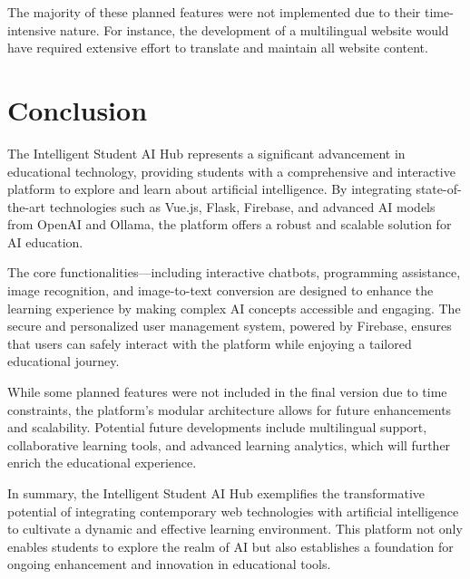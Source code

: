 The majority of these planned features were not implemented due to their time-intensive nature. For instance, the development of a multilingual website would have required extensive effort to translate and maintain all website content.

\section{Conclusion}

The Intelligent Student AI Hub represents a significant advancement in educational technology, 
providing students with a comprehensive and interactive platform to explore and learn about artificial intelligence. 
By integrating state-of-the-art technologies such as Vue.js, Flask, Firebase, and advanced AI models from OpenAI and Ollama, 
the platform offers a robust and scalable solution for AI education.

The core functionalities—including interactive chatbots, programming assistance, image recognition, 
and image-to-text conversion are designed to enhance the learning experience by making complex AI concepts accessible and engaging. 
The secure and personalized user management system, powered by Firebase, ensures that users can safely interact with the platform while enjoying a tailored educational journey.

While some planned features were not included in the final version due to time constraints, the platform's modular architecture allows for future enhancements and scalability.
Potential future developments include multilingual support, collaborative learning tools, and advanced learning analytics, 
which will further enrich the educational experience.

In summary, the Intelligent Student AI Hub exemplifies the transformative potential of integrating contemporary web technologies
with artificial intelligence to cultivate a dynamic and effective learning environment. This platform not only enables students 
to explore the realm of AI but also establishes a foundation for ongoing enhancement and innovation in educational tools. 


